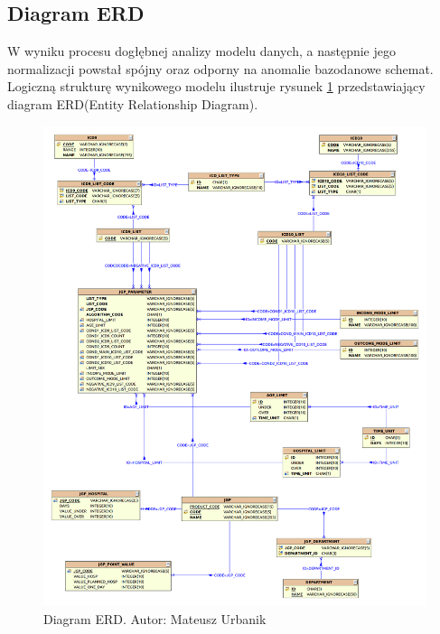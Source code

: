 


\newpage
\subsection{Diagram ERD}
\label{sec:diagramERD}

W wyniku procesu dogłębnej analizy modelu danych, a następnie jego normalizacji powstał spójny oraz odporny na anomalie bazodanowe schemat. Logiczną strukturę wynikowego modelu ilustruje rysunek \ref{img:diagram_erd} przedstawiający diagram ERD(Entity Relationship Diagram).

\begin{figure}[!ht]
\centering
\includegraphics[scale=0.31]{images/erd}
\caption[Diagram ERD]{Diagram ERD. Autor: Mateusz Urbanik}
\label{img:diagram_erd}
\end{figure}

